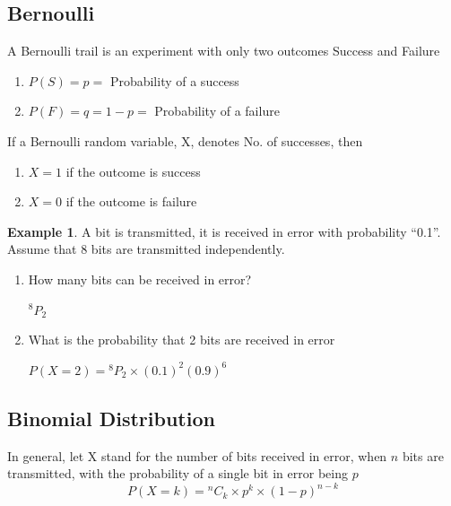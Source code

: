\documentclass[12pt]{article}
\theoremstyle{definition}
\newtheorem{exmp}{Example}[section]
\newcommand*{\Perm}[2]{{}^{#1}\!P_{#2}}%
\newcommand*{\Comb}[2]{{}^{#1}C_{#2}}%
\begin{document}
\subsection{Bernoulli}
A Bernoulli trail is an experiment with only two outcomes Success and Failure 
\begin{enumerate}
    \item $P(S) = p = $ Probability of a success
    \item $P(F) = q = 1 - p = $ Probability of a failure
\end{enumerate}
If a Bernoulli random variable, X, denotes No. of successes, then
\begin{enumerate}
    \item $ X = 1$ if the outcome is success
    \item $ X = 0$ if the outcome is failure
\end{enumerate}
\begin{exmp}
    A bit is transmitted, it is received in error with probability “0.1”.\\
    Assume that 8 bits are transmitted independently.
    \begin{enumerate}
        \item How many bits can be received in error?
            \begin{center}
                $\Perm{8}{2}$
            \end{center}   
        \item What is the probability that 2 bits are received in error
            \begin{center}
                $P(X=2) = \Perm{8}{2} \times (0.1)^2 (0.9)^6  $  
            \end{center}   
    \end{enumerate}
\end{exmp}    
\subsection{Binomial Distribution}
In general, let X stand for the number of bits received in error, when $n$ bits are transmitted,
with the probability of a single bit in error being $p$
\begin{equation}
    P (X = k) = \Comb{n}{k} \times p^k \times (1-p)^{n - k} 
\end{equation}    
\end{document}
